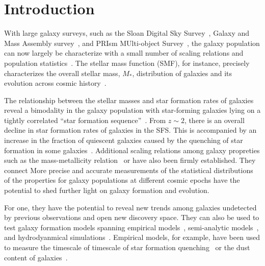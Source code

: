 \section{Introduction} \label{sec:intro} 
With large galaxy surveys, such as the Sloan Digital Sky
Survey~\citep[SDSS;][]{york2000}, Galaxy and Mass Assembly
survey~\citep[GAMA;][]{driver2011}, and 
PRIsm MUlti-object Survey~\citep[PRIMUS;][]{coil2011}, 
the galaxy population can now largely be characterize with a small number of
scaling relations and population 
statistics~\citep[see][for a review]{blanton2009}.
The stellar mass function (SMF), for instance, precisely characterizes the
overall stellar mass, $M_*$, distribution of galaxies and its
evolution across cosmic history~\citep{li2009, marchesini2009, moustakas2013,
muzzin2013, leja2019a, driver2022}.


The relationship between the stellar masses and star formation rates of
galaxies reveal a bimodality in the galaxy population with star-forming
galaxies lying on a tightly correlated ``star formation
sequence''~\citep[SFS;][]{noeske2007, daddi2007, salim2007, speagle2014,
hahn2019}.
From $z\sim 2$, there is an overall decline in star formation rates of galaxies
in the SFS. 
This is accompanied by an increase in the fraction of quiescent galaxies caused
by the quenching of star formation in some galaxies~\citep{kauffmann2003a,
blanton2003, baldry2006, taylor2009}. 
Additional scaling relations among galaxy propreties such as the
mass-metallicity relation~\citep{tremonti2004} or  have also been firmly established. 
They connect  
More precise and accurate measurements of the statistical distributions of the
properties for galaxy populations at different cosmic epochs have the potential
to shed further light on galaxy formation and evolution. 

For one, they have the potential to reveal new trends among galaxies undetected
by previous observations and open new discovery space.
They can also be used to test galaxy formation models spanning 
empirical models~\citep[\emph{e.g.} {\sc UniverseMachine};][]{behroozi2019}, 
semi-analytic models~\citep[\emph{e.g.}][]{benson2012, henriques2015,
somerville2015}, and 
hydrodyanmical simulations~\citep[see][for a review]{somerville2015a}. 
Empirical models, for example, have been used to measure the timescale of 
timescale of star formation quenching~\citep{wetzel2013, hahn2017, tinker2017}
or the dust content of galaxies~\citep{hahn2021}. 

